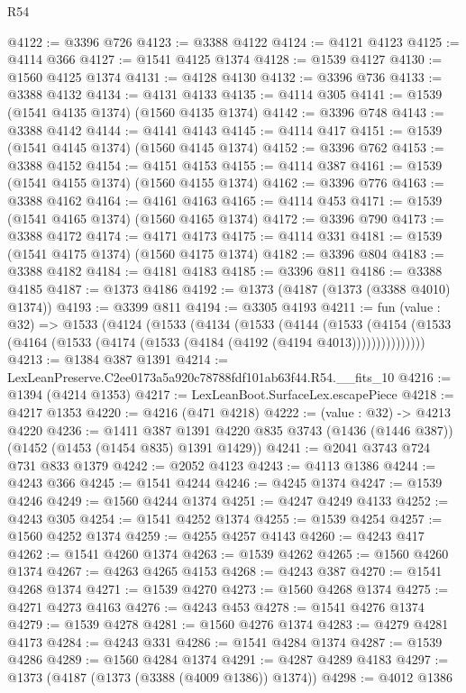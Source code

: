 \begin{lexlean}{R54}
\begin{coremodule}
@4122 := @3396 @726
@4123 := @3388 @4122
@4124 := @4121 @4123
@4125 := @4114 @366
@4127 := @1541 @4125 @1374
@4128 := @1539 @4127
@4130 := @1560 @4125 @1374
@4131 := @4128 @4130
@4132 := @3396 @736
@4133 := @3388 @4132
@4134 := @4131 @4133
@4135 := @4114 @305
@4141 := @1539 (@1541 @4135 @1374) (@1560 @4135 @1374)
@4142 := @3396 @748
@4143 := @3388 @4142
@4144 := @4141 @4143
@4145 := @4114 @417
@4151 := @1539 (@1541 @4145 @1374) (@1560 @4145 @1374)
@4152 := @3396 @762
@4153 := @3388 @4152
@4154 := @4151 @4153
@4155 := @4114 @387
@4161 := @1539 (@1541 @4155 @1374) (@1560 @4155 @1374)
@4162 := @3396 @776
@4163 := @3388 @4162
@4164 := @4161 @4163
@4165 := @4114 @453
@4171 := @1539 (@1541 @4165 @1374) (@1560 @4165 @1374)
@4172 := @3396 @790
@4173 := @3388 @4172
@4174 := @4171 @4173
@4175 := @4114 @331
@4181 := @1539 (@1541 @4175 @1374) (@1560 @4175 @1374)
@4182 := @3396 @804
@4183 := @3388 @4182
@4184 := @4181 @4183
@4185 := @3396 @811
@4186 := @3388 @4185
@4187 := @1373 @4186
@4192 := @1373 (@4187 (@1373 (@3388 @4010) @1374))
@4193 := @3399 @811
@4194 := @3305 @4193
@4211 := fun (value : @32) =>
  @1533
    (@4124
      (@1533
        (@4134
          (@1533
            (@4144
              (@1533
                (@4154 (@1533 (@4164 (@1533 (@4174 (@1533 (@4184 (@4192 (@4194 @4013)))))))))))))))
@4213 := @1384 @387 @1391
@4214 := LexLeanPreserve.C2ee0173a5a920c78788fdf101ab63f44.R54.__fits_10
@4216 := @1394 (@4214 @1353)
@4217 := LexLeanBoot.SurfaceLex.escapePiece
@4218 := @4217 @1353
@4220 := @4216 (@471 @4218)
@4222 := (value : @32) -> @4213 @4220
@4236 := @1411
    @387
    @1391
    @4220
    @835
    @3743
    (@1436 (@1446 @387))
    (@1452 (@1453 (@1454 @835) @1391 @1429))
@4241 := @2041 @3743 @724 @731 @833 @1379
@4242 := @2052 @4123
@4243 := @4113 @1386
@4244 := @4243 @366
@4245 := @1541 @4244
@4246 := @4245 @1374
@4247 := @1539 @4246
@4249 := @1560 @4244 @1374
@4251 := @4247 @4249 @4133
@4252 := @4243 @305
@4254 := @1541 @4252 @1374
@4255 := @1539 @4254
@4257 := @1560 @4252 @1374
@4259 := @4255 @4257 @4143
@4260 := @4243 @417
@4262 := @1541 @4260 @1374
@4263 := @1539 @4262
@4265 := @1560 @4260 @1374
@4267 := @4263 @4265 @4153
@4268 := @4243 @387
@4270 := @1541 @4268 @1374
@4271 := @1539 @4270
@4273 := @1560 @4268 @1374
@4275 := @4271 @4273 @4163
@4276 := @4243 @453
@4278 := @1541 @4276 @1374
@4279 := @1539 @4278
@4281 := @1560 @4276 @1374
@4283 := @4279 @4281 @4173
@4284 := @4243 @331
@4286 := @1541 @4284 @1374
@4287 := @1539 @4286
@4289 := @1560 @4284 @1374
@4291 := @4287 @4289 @4183
@4297 := @1373 (@4187 (@1373 (@3388 (@4009 @1386)) @1374))
@4298 := @4012 @1386

\end{coremodule}
\end{lexlean}
